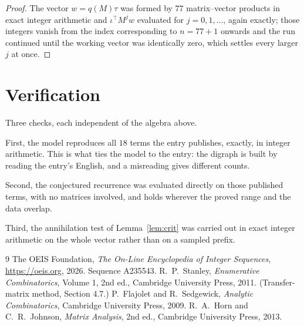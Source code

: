 \documentclass[11pt,a4paper]{article}
\theoremstyle{plain}
\theoremstyle{definition}
\begin{document}
\begin{proof}
The vector $w=q(M)\tau$ was formed by $77$ matrix--vector products in exact integer
arithmetic and $\iota^{\!\top}M^{j}w$ evaluated for $j=0,1,\dots$, again exactly; those
integers vanish from the index corresponding to $n=77+1$ onwards and the run continued
until the working vector was identically zero, which settles every larger $j$ at once.
\end{proof}

\section{Verification}

Three checks, each independent of the algebra above.

First, the model reproduces all $18$ terms the entry publishes, exactly, in integer
arithmetic. This is what ties the model to the entry: the digraph is built by reading the
entry's English, and a misreading gives different counts.

Second, the conjectured recurrence was evaluated directly on those published terms, with no
matrices involved, and holds wherever the proved range and the data overlap.

Third, the annihilation test of Lemma~\ref{lem:crit} was carried out in exact integer
arithmetic on the whole vector rather than on a sampled prefix.

\begin{thebibliography}{9}
 The OEIS Foundation, \emph{The On-Line Encyclopedia of Integer
Sequences}, \url{https://oeis.org}, 2026. Sequence A235543.
 R.~P.~Stanley, \emph{Enumerative Combinatorics}, Volume 1, 2nd ed.,
Cambridge University Press, 2011. (Transfer-matrix method, Section 4.7.)
 P.~Flajolet and R.~Sedgewick, \emph{Analytic Combinatorics}, Cambridge
University Press, 2009.
 R.~A.~Horn and C.~R.~Johnson, \emph{Matrix Analysis}, 2nd ed., Cambridge
University Press, 2013.
\end{thebibliography}
\end{document}
